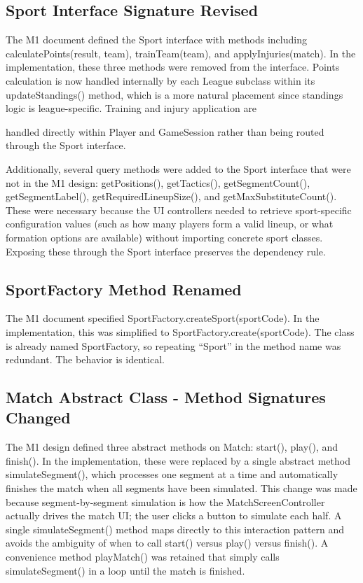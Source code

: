 \documentclass[11pt,a4paper]{article}
\begin{document}
\subsection{Sport Interface Signature Revised}

The M1 document defined the Sport interface with methods including calculatePoints(result, team), trainTeam(team), and applyInjuries(match). In the implementation, these three methods were removed from the interface. Points calculation is now handled internally by each League subclass within its updateStandings() method, which is a more natural placement since standings logic is league-specific. Training and injury application are

handled directly within Player and GameSession rather than being routed through the Sport interface.

Additionally, several query methods were added to the Sport interface that were not in the M1 design: getPositions(), getTactics(), getSegmentCount(), getSegmentLabel(), getRequiredLineupSize(), and getMaxSubstituteCount(). These were necessary because the UI controllers needed to retrieve sport-specific configuration values (such as how many players form a valid lineup, or what formation options are available) without importing concrete sport classes. Exposing these through the Sport interface preserves the dependency rule.

\subsection{SportFactory Method Renamed}

The M1 document specified SportFactory.createSport(sportCode). In the implementation, this was simplified to SportFactory.create(sportCode). The class is already named SportFactory, so repeating ``Sport'' in the method name was redundant. The behavior is identical.

\subsection{Match Abstract Class - Method Signatures Changed}

The M1 design defined three abstract methods on Match: start(), play(), and finish(). In the implementation, these were replaced by a single abstract method simulateSegment(), which processes one segment at a time and automatically finishes the match when all segments have been simulated. This change was made because segment-by-segment simulation is how the MatchScreenController actually drives the match UI; the user clicks a button to simulate each half. A single simulateSegment() method maps directly to this interaction pattern and avoids the ambiguity of when to call start() versus play() versus finish(). A convenience method playMatch() was retained that simply calls simulateSegment() in a loop until the match is finished.
\end{document}
